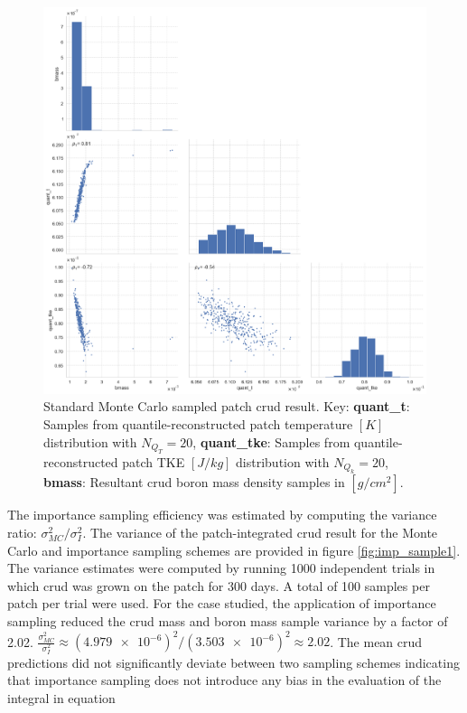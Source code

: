 \begin{figure}[H]
    \centering
    \includegraphics[width=0.99\linewidth]{figs/imp_patch/original_t_tke_bmass_scatter}
    \caption[Standard Monte Carlo sampled patch crud scatter plot result.]{Standard Monte Carlo sampled patch crud result. Key: \textbf{quant\_t}: Samples from quantile-reconstructed patch temperature $[K]$ distribution with $N_{Q_T}=20$,  \textbf{quant\_tke}: Samples from quantile-reconstructed patch TKE $[J/kg]$ distribution with $N_{Q_k}=20$,  \textbf{bmass}: Resultant crud boron mass density samples in $[g/cm^2]$.  }
    \label{fig:originalttkebmassscatter}
\end{figure}

The importance sampling efficiency was estimated by computing the variance ratio:  $\sigma^2_{MC}/\sigma^2_{I}$.  The variance of the patch-integrated crud result for the Monte Carlo and importance sampling schemes are provided in figure \ref{fig:imp_sample1}.  The variance estimates were computed by running 1000 independent trials in which crud was grown on the patch for 300 days.  A total of 100 samples per patch per trial were used.  For the case studied, the application of importance sampling reduced the crud mass and boron mass sample variance by a factor of 2.02. $\frac{\sigma^2_{MC}}{\sigma^2_{I}} \approx (\num{4.979e-6})^2 / (\num{3.503e-6})^2  \approx 2.02$.  The mean crud predictions did not significantly deviate between two sampling schemes indicating that importance sampling does not introduce any bias in the evaluation of the integral in equation %

